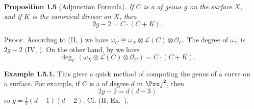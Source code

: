 {\medskip
\noindent\hypertarget{result-V-1.5}{}\textbf{Proposition 1.5} (Adjunction Formula). \emph{If $C$ is a  of genus $g$ on the surface $X$, and if $K$ is the canonical divisor on $X$, then}
\[
2g-2=C\cdot(C+K).
\]

\smallskip
\noindent\textsc{Proof.} According to (II, ) we have $\omega_C\cong\omega_X\otimes\mathcal L(C)\otimes\mathcal O_C$. The degree of $\omega_C$ is $2g-2$ (IV, ). On the other hand, by  we have
\[
\deg_C(\omega_X\otimes\mathcal L(C)\otimes\mathcal O_C)=C\cdot(C+K).
\]

\medskip
\noindent\hypertarget{result-V-1.5.1}{}\textbf{Example 1.5.1.} This gives a quick method of computing the genus of a curve on a surface. For example, if $C$ is a  of degree $d$ in $\Proj^2$, then
\[
2g-2=d(d-3)
\]
so $g=\tfrac12(d-1)(d-2)$. Cf. (II, Ex.~).\EditionText{}
}
